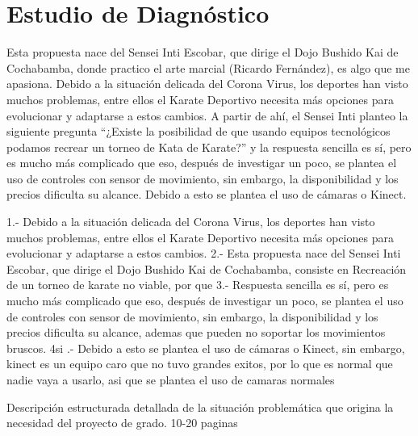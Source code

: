 \chapter{Estudio de Diagnóstico}


Esta propuesta nace del Sensei Inti Escobar, que dirige el Dojo Bushido Kai de Cochabamba, donde practico el arte marcial (Ricardo Fernández), es algo que me apasiona. Debido a la situación delicada del Corona Virus, los deportes han visto muchos problemas, entre ellos el Karate Deportivo necesita más opciones para evolucionar y adaptarse a estos cambios.
A partir de ahí, el Sensei Inti planteo la siguiente pregunta “¿Existe la posibilidad de que usando equipos tecnológicos podamos recrear un torneo de Kata de Karate?” y la respuesta sencilla es sí, pero es mucho más complicado que eso, después de investigar un poco, se plantea el uso de controles con sensor de movimiento, sin embargo, la disponibilidad y los precios dificulta su alcance. Debido a esto se plantea el uso de cámaras o Kinect.


1.- Debido a la situación delicada del Corona Virus, los deportes han visto muchos problemas, entre ellos el Karate Deportivo necesita más opciones para evolucionar y adaptarse a estos cambios.
2.- Esta propuesta nace del Sensei Inti Escobar, que dirige el Dojo Bushido Kai de Cochabamba, consiste en  Recreación de un torneo de karate no viable, por que
3.- Respuesta sencilla es sí, pero es mucho más complicado que eso, después de investigar un poco, se plantea el uso de controles con sensor de movimiento, sin embargo, la disponibilidad y los precios dificulta su alcance, ademas que pueden no soportar los movimientos bruscos.
4si .- Debido a esto se plantea el uso de cámaras o Kinect, sin embargo, kinect es un equipo caro que no tuvo grandes exitos, por lo que es normal que nadie vaya a usarlo, asi que se plantea el uso de camaras normales


Descripción estructurada detallada de la situación
problemática que origina la necesidad del proyecto
de grado.
10-20 paginas


